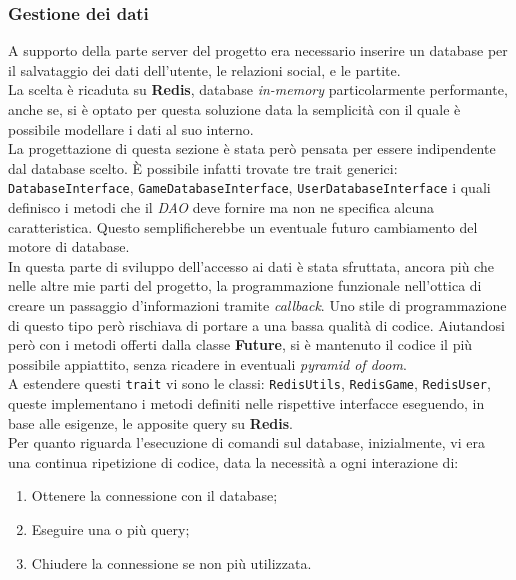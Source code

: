         \subsubsection{Gestione dei dati}
          A supporto della parte server del progetto era necessario inserire un database per il salvataggio dei dati dell'utente, le relazioni social, e le partite. 
          \\
          La scelta è ricaduta su \textbf{Redis}, database \textit{in-memory} particolarmente performante, anche se, si è optato per questa soluzione data la semplicità con il quale è possibile modellare i dati al suo interno.
          \\
          La progettazione di questa sezione è stata però pensata per essere indipendente dal database scelto. È possibile infatti trovate tre trait generici: \texttt{DatabaseInterface}, \texttt{GameDatabaseInterface}, \texttt{UserDatabaseInterface} i quali definisco i metodi che il \textit{DAO} deve fornire ma non ne specifica alcuna caratteristica. Questo semplificherebbe un eventuale futuro cambiamento del motore di database. \\
          In questa parte di sviluppo dell'accesso ai dati è stata sfruttata, ancora più che nelle altre mie parti del progetto, la programmazione funzionale nell'ottica di creare un passaggio d'informazioni tramite \textit{callback}. Uno stile di programmazione di questo tipo però rischiava di portare a una bassa qualità di codice. Aiutandosi però con i metodi offerti dalla classe \textbf{Future}, si è mantenuto il codice il più possibile appiattito, senza ricadere in eventuali \textit{pyramid of doom}.
          \\
          A estendere questi \texttt{trait} vi sono le classi: \texttt{RedisUtils}, \texttt{RedisGame}, \texttt{RedisUser}, queste implementano i metodi definiti nelle rispettive interfacce eseguendo, in base alle esigenze, le apposite query su \textbf{Redis}.
          \\
          Per quanto riguarda l'esecuzione di comandi sul database, inizialmente, vi era una continua ripetizione di codice, data la necessità a ogni interazione di:
          
          \begin{enumerate}
           \item Ottenere la connessione con il database;
           \item Eseguire una o più query;
           \item Chiudere la connessione se non più utilizzata.
          \end{enumerate}
          
